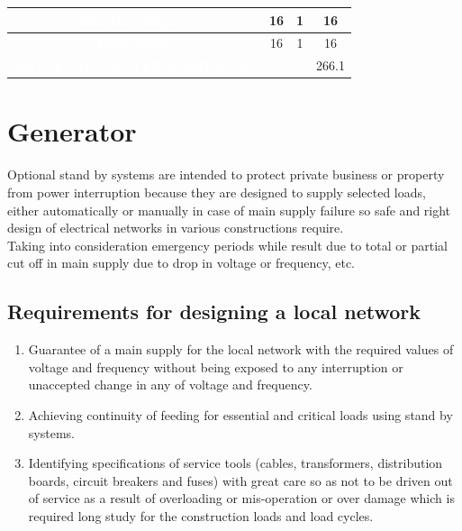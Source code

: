 \documentclass[12pt,fleqn]{book} %
\begin{document}
\begin{enumerate}
\begin{table}[h]
\begin{tabular}{!{\color{white}\vrule}c!{\color{black}\vrule}c!{\color{white}\vrule}c!{\color{white}\vrule}c!{\color{white}\vrule}}
\hline
{} {}\textbf{\textcolor{white}{One Day Surgery}}            & 16                                                       & 1                                                   & 16                                     \\ 
\hline
{} {}\textbf{\textcolor{white}{Observation}}              & 16                                                       & 1                                                   & 16                                     \\ 
\hline
{} {}\textbf{\textcolor{white}{TOTAL CONNECTED LOAD (KVA)}} & ~                                                        & ~                                                   & 266.1                                  \\
\hline
\end{tabular}
\end{table}
\end{enumerate}
\section{Generator}
Optional stand by systems are intended to protect private business or property from power interruption because they are designed to supply selected loads, either automatically or manually in case of main supply failure so safe and right design of electrical networks in various constructions require.\\
Taking into consideration emergency periods while result due to total or partial cut off in main supply due to drop in voltage or frequency, etc.
\subsection{Requirements for designing a local network}
\begin{enumerate}
    \item Guarantee of a main supply for the local network with the required values of voltage and frequency without being exposed to any interruption or unaccepted change in any of voltage and frequency.
    \item Achieving continuity of feeding for essential and critical loads using stand by systems.
    \item Identifying specifications of service tools (cables, transformers, distribution boards, circuit breakers and fuses) with great care so as not to be driven out of service as a result of overloading or mis-operation or over damage which is required long study for the construction loads and load cycles.
\end{enumerate}
\end{document}
